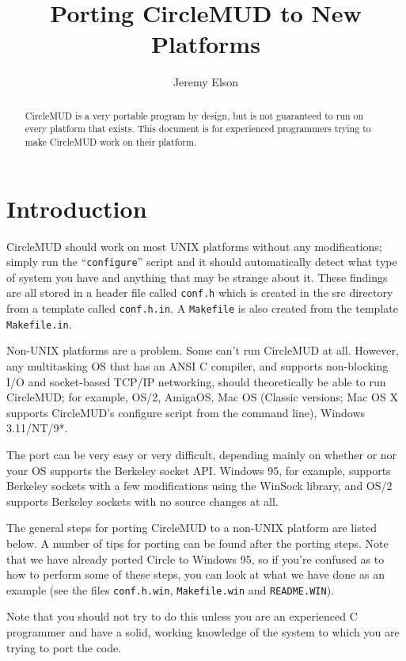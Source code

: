 \documentclass[11pt]{article}
\title{Porting CircleMUD to New Platforms}
\author{Jeremy Elson}
\begin{document}
\maketitle

\begin{abstract}
CircleMUD is a very portable program by design, but is not guaranteed to run on every platform that exists.  This document is for experienced programmers trying to make CircleMUD work on their platform.
\end{abstract}

\section{Introduction}
CircleMUD should work on most UNIX platforms without any modifications; simply run the ``\texttt{configure}'' script and it should automatically detect what type of system you have and anything that may be strange about it.  These findings are all stored in a header file called \texttt{conf.h} which is created in the src directory from a template called \texttt{conf.h.in}.  A \texttt{Makefile} is also created from the template \texttt{Makefile.in}. 
\par
Non-UNIX platforms are a problem.  Some can't run CircleMUD at all.  However, any multitasking OS that has an ANSI C compiler, and supports non-blocking I/O and socket-based TCP/IP networking, should theoretically be able to run CircleMUD; for example, OS/2, AmigaOS, Mac OS (Classic versions; Mac OS X supports CircleMUD's configure script from the command line), Windows 3.11/NT/9*.
\par
The port can be very easy or very difficult, depending mainly on whether or nor your OS supports the Berkeley socket API.  Windows 95, for example, supports Berkeley sockets with a few modifications using the WinSock library, and OS/2 supports Berkeley sockets with no source changes at all. 
\par
The general steps for porting CircleMUD to a non-UNIX platform are listed below.  A number of tips for porting can be found after the porting steps. Note that we have already ported Circle to Windows 95, so if you're confused as to how to perform some of these steps, you can look at what we have done as an example (see the files \texttt{conf.h.win}, \texttt{Makefile.win} and \texttt{README.WIN}). 
\par
Note that you should not try to do this unless you are an experienced C programmer and have a solid, working knowledge of the system to which you are trying to port the code. 
\end{document}
